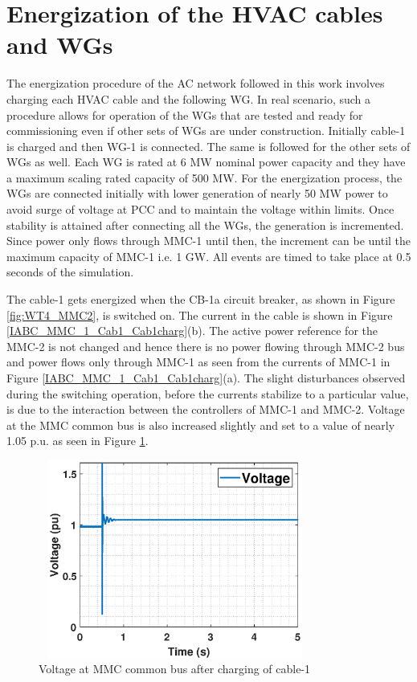 \section{Energization of the HVAC cables and WGs}
The energization procedure of the \gls{AC} network followed in this work involves charging each \gls{HVAC} cable and the following \gls{WG}. In real scenario, such a procedure allows for operation of the \gls{WG}s that are tested and ready for commissioning even if other sets of \gls{WG}s are under construction. Initially cable-1 is charged and then \gls{WG}-1 is connected. The same is followed for the other sets of \gls{WG}s as well. Each \gls{WG} is rated at 6 MW nominal power capacity and they have a maximum scaling rated capacity of 500 MW. For the energization process, the \gls{WG}s are connected initially with lower generation of nearly 50 MW power to avoid surge of voltage at \gls{PCC} and to maintain the voltage within limits. Once stability is attained after connecting all the \gls{WG}s, the generation is incremented. Since power only flows through \gls{MMC}-1 until then, the increment can be until the maximum capacity of \gls{MMC}-1 i.e. 1 GW. All events are timed to take place at 0.5 seconds of the simulation.   

The cable-1 gets energized when the CB-1a circuit breaker, as shown in Figure \ref{fig:WT4_MMC2}, is switched on. The current in the cable is shown in Figure \ref{IABC_MMC_1_Cab1_Cab1charg}(b). The active power reference for the \gls{MMC}-2 is not changed and hence there is no power flowing through \gls{MMC}-2 bus and power flows only through \gls{MMC}-1 as seen from the currents of \gls{MMC}-1 in Figure \ref{IABC_MMC_1_Cab1_Cab1charg}(a). The slight disturbances observed during the switching operation, before the currents stabilize to a particular value, is due to the interaction between the controllers of \gls{MMC}-1 and \gls{MMC}-2. Voltage at the \gls{MMC} common bus is also increased slightly and set to a value of nearly 1.05 p.u. as seen in Figure \ref{VACP_MMC_bus_Cab1charg}.

\begin{figure}[H]
\centering
    \includegraphics[height = 6.5cm,width = 9cm]{Diagrams/Chapter_5/VACP_MMC_bus_Cab1charg.eps}
    \caption{Voltage at MMC common bus after charging of cable-1}
    \label{VACP_MMC_bus_Cab1charg}
\end{figure}


